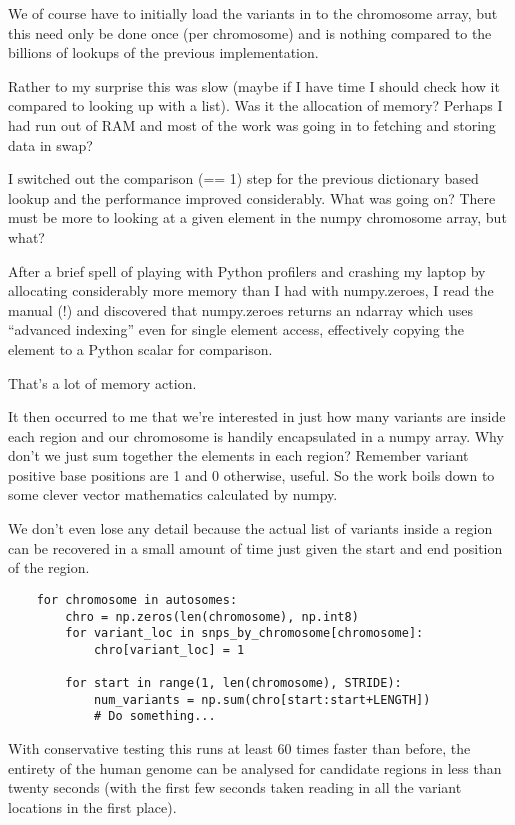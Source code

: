 We of course have to initially load the variants in to the chromosome array,
but this need only be done once (per chromosome) and is nothing compared to the
billions of lookups of the previous implementation.

Rather to my surprise this was slow  (maybe if I have time I should
check how it compared to looking up with a list). Was it the allocation of
memory? Perhaps I had run out of RAM and most of the work was going in to
fetching and storing data in swap?

I switched out the comparison (== 1) step for the previous dictionary based
lookup and the performance improved considerably. What was going on? There must
be more to looking at a given element in the numpy chromosome array, but what?

After a brief spell of playing with Python profilers and crashing my laptop by
allocating considerably more memory than I had with numpy.zeroes, I read the
manual (!) and discovered that numpy.zeroes returns an ndarray which uses
“advanced indexing” even for single element access, effectively copying the
element to a Python scalar for comparison.

That’s a lot of memory action.

It then occurred to me that we’re interested in just how many variants are
inside each region and our chromosome is handily encapsulated in a numpy array.
Why don’t we just sum together the elements in each region? Remember variant
positive base positions are 1 and 0 otherwise, useful. So the work boils down
to some clever vector mathematics calculated by numpy.

We don’t even lose any detail because the actual list of variants inside a
region can be recovered in a small amount of time just given the start and end
position of the region.

\begin{verbatim}
    for chromosome in autosomes:
        chro = np.zeros(len(chromosome), np.int8)
        for variant_loc in snps_by_chromosome[chromosome]:
            chro[variant_loc] = 1

        for start in range(1, len(chromosome), STRIDE):
            num_variants = np.sum(chro[start:start+LENGTH])
            # Do something...
\end{verbatim}

With conservative testing this runs at least 60 times faster than before, the
entirety of the human genome can be analysed for candidate regions in less than
twenty seconds (with the first few seconds taken reading in all the variant
locations in the first place).

